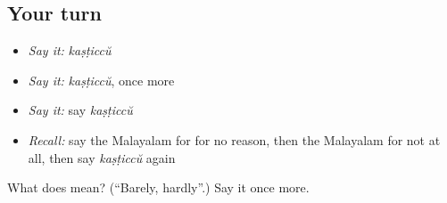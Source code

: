 \subsection*{Your turn}
\begin{itemize}
\raggedright
  \item \emph{Say it:} \emph{kaṣṭiccŭ}
  \item \emph{Say it:} \emph{kaṣṭiccŭ}, once more
  \item \emph{Say it:} say \emph{kaṣṭiccŭ}
  \item \emph{Recall:} say the Malayalam for for no reason, then the Malayalam for not at all, then say \emph{kaṣṭiccŭ} again
\end{itemize}

\begin{tcolorbox}[breakable,colback=teal!4,colframe=teal!35!black,title={Before you move on}]
What does  mean? (\textquotedblleft{}Barely, hardly\textquotedblright{}.) Say it once more.
\end{tcolorbox}
